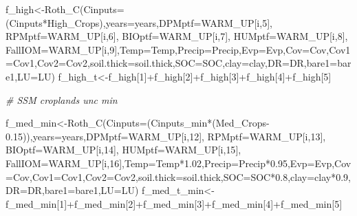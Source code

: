 \documentclass[
  10pt,
  b5paper,
]{book}
\newenvironment{Shaded}{\begin{snugshade}}{\end{snugshade}}
\newcommand{\AttributeTok}[1]{\textcolor[rgb]{0.77,0.63,0.00}{#1}}
\newcommand{\CommentTok}[1]{\textcolor[rgb]{0.56,0.35,0.01}{\textit{#1}}}
\newcommand{\DecValTok}[1]{\textcolor[rgb]{0.00,0.00,0.81}{#1}}
\newcommand{\FloatTok}[1]{\textcolor[rgb]{0.00,0.00,0.81}{#1}}
\newcommand{\FunctionTok}[1]{\textcolor[rgb]{0.00,0.00,0.00}{#1}}
\newcommand{\NormalTok}[1]{#1}
\newcommand{\OtherTok}[1]{\textcolor[rgb]{0.56,0.35,0.01}{#1}}
\newcommand{\SpecialCharTok}[1]{\textcolor[rgb]{0.00,0.00,0.00}{#1}}
\begin{document}
\begin{Shaded}
\begin{Highlighting}[]
\NormalTok{f\_high}\OtherTok{\textless{}{-}}\FunctionTok{Roth\_C}\NormalTok{(}\AttributeTok{Cinputs=}\NormalTok{(Cinputs}\SpecialCharTok{*}\NormalTok{High\_Crops),}\AttributeTok{years=}\NormalTok{years,}\AttributeTok{DPMptf=}\NormalTok{WARM\_UP[i,}\DecValTok{5}\NormalTok{], }\AttributeTok{RPMptf=}\NormalTok{WARM\_UP[i,}\DecValTok{6}\NormalTok{], }\AttributeTok{BIOptf=}\NormalTok{WARM\_UP[i,}\DecValTok{7}\NormalTok{], }\AttributeTok{HUMptf=}\NormalTok{WARM\_UP[i,}\DecValTok{8}\NormalTok{], }\AttributeTok{FallIOM=}\NormalTok{WARM\_UP[i,}\DecValTok{9}\NormalTok{],}\AttributeTok{Temp=}\NormalTok{Temp,}\AttributeTok{Precip=}\NormalTok{Precip,}\AttributeTok{Evp=}\NormalTok{Evp,}\AttributeTok{Cov=}\NormalTok{Cov,}\AttributeTok{Cov1=}\NormalTok{Cov1,}\AttributeTok{Cov2=}\NormalTok{Cov2,}\AttributeTok{soil.thick=}\NormalTok{soil.thick,}\AttributeTok{SOC=}\NormalTok{SOC,}\AttributeTok{clay=}\NormalTok{clay,}\AttributeTok{DR=}\NormalTok{DR,}\AttributeTok{bare1=}\NormalTok{bare1,}\AttributeTok{LU=}\NormalTok{LU)}
\NormalTok{f\_high\_t}\OtherTok{\textless{}{-}}\NormalTok{f\_high[}\DecValTok{1}\NormalTok{]}\SpecialCharTok{+}\NormalTok{f\_high[}\DecValTok{2}\NormalTok{]}\SpecialCharTok{+}\NormalTok{f\_high[}\DecValTok{3}\NormalTok{]}\SpecialCharTok{+}\NormalTok{f\_high[}\DecValTok{4}\NormalTok{]}\SpecialCharTok{+}\NormalTok{f\_high[}\DecValTok{5}\NormalTok{]}

\CommentTok{\# SSM croplands unc min}

\NormalTok{f\_med\_min}\OtherTok{\textless{}{-}}\FunctionTok{Roth\_C}\NormalTok{(}\AttributeTok{Cinputs=}\NormalTok{(Cinputs\_min}\SpecialCharTok{*}\NormalTok{(Med\_Crops}\FloatTok{{-}0.15}\NormalTok{)),}\AttributeTok{years=}\NormalTok{years,}\AttributeTok{DPMptf=}\NormalTok{WARM\_UP[i,}\DecValTok{12}\NormalTok{], }\AttributeTok{RPMptf=}\NormalTok{WARM\_UP[i,}\DecValTok{13}\NormalTok{], }\AttributeTok{BIOptf=}\NormalTok{WARM\_UP[i,}\DecValTok{14}\NormalTok{], }\AttributeTok{HUMptf=}\NormalTok{WARM\_UP[i,}\DecValTok{15}\NormalTok{], }\AttributeTok{FallIOM=}\NormalTok{WARM\_UP[i,}\DecValTok{16}\NormalTok{],}\AttributeTok{Temp=}\NormalTok{Temp}\SpecialCharTok{*}\FloatTok{1.02}\NormalTok{,}\AttributeTok{Precip=}\NormalTok{Precip}\SpecialCharTok{*}\FloatTok{0.95}\NormalTok{,}\AttributeTok{Evp=}\NormalTok{Evp,}\AttributeTok{Cov=}\NormalTok{Cov,}\AttributeTok{Cov1=}\NormalTok{Cov1,}\AttributeTok{Cov2=}\NormalTok{Cov2,}\AttributeTok{soil.thick=}\NormalTok{soil.thick,}\AttributeTok{SOC=}\NormalTok{SOC}\SpecialCharTok{*}\FloatTok{0.8}\NormalTok{,}\AttributeTok{clay=}\NormalTok{clay}\SpecialCharTok{*}\FloatTok{0.9}\NormalTok{,}\AttributeTok{DR=}\NormalTok{DR,}\AttributeTok{bare1=}\NormalTok{bare1,}\AttributeTok{LU=}\NormalTok{LU)}
\NormalTok{f\_med\_t\_min}\OtherTok{\textless{}{-}}\NormalTok{f\_med\_min[}\DecValTok{1}\NormalTok{]}\SpecialCharTok{+}\NormalTok{f\_med\_min[}\DecValTok{2}\NormalTok{]}\SpecialCharTok{+}\NormalTok{f\_med\_min[}\DecValTok{3}\NormalTok{]}\SpecialCharTok{+}\NormalTok{f\_med\_min[}\DecValTok{4}\NormalTok{]}\SpecialCharTok{+}\NormalTok{f\_med\_min[}\DecValTok{5}\NormalTok{]}


\end{Highlighting}
\end{Shaded}
\end{document}
